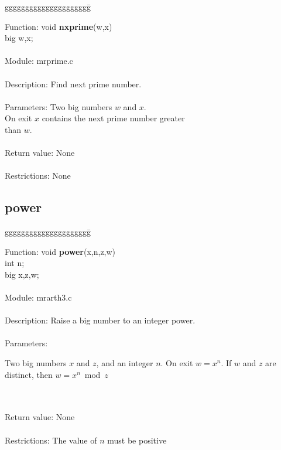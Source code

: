 \begin{tabbing}
ggggggggggggggggggggg\= \kill

      Function:      \>void {\bf nxprime}(w,x) \\
                     \>big w,x; \\
      \ \\
      Module:        \>mrprime.c \\
      \ \\
      Description:   \>Find next prime number. \\
      \ \\
      Parameters:    \>Two big numbers $w$ and $x$. \\
                     \>On exit $x$ contains the next prime number greater \\
                     \>than $w$. \\
      \ \\
      Return value:  \>None \\
      \ \\
      Restrictions:  \>None \\

\end{tabbing}
\pagebreak

\subsection{power}

\begin{tabbing}
ggggggggggggggggggggg\= \kill
              
      Function:      \>void {\bf power}(x,n,z,w) \\
                     \>int n; \\
                     \>big x,z,w; \\
      \ \\
      Module:        \>mrarth3.c \\
      \ \\
      Description:   \>Raise a big number to an integer power. \\
      \ \\
      Parameters:    \>
                     \parbox[t]{3 in}
                     {Two big numbers $x$ and $z$, and an integer $n$. On exit
                     $w=x^n$. If $w$ and $z$ are distinct, then $w=x^n \bmod z$
                     }  \\
      \ \\
      Return value:  \>None \\
      \ \\
      Restrictions:  \>The value of $n$ must be positive \\
      
\end{tabbing}

